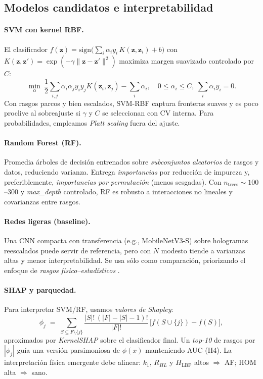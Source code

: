 \subsection{Modelos candidatos e interpretabilidad}
\label{subsec:models}

\paragraph{SVM con kernel RBF.} El clasificador $f(\mathbf{z})=\mathrm{sign}\!\big(\sum_i \alpha_i y_i\,K(\mathbf{z},\mathbf{z}_i)+b\big)$ con $K(\mathbf{z},\mathbf{z}')=\exp(-\gamma\|\mathbf{z}-\mathbf{z}'\|^2)$ maximiza margen suavizado controlado por $C$:
\[
\min_{\alpha}\ \frac{1}{2}\sum_{i,j}\alpha_i\alpha_j y_i y_j K(\mathbf{z}_i,\mathbf{z}_j) - \sum_i \alpha_i,\quad 0\le \alpha_i\le C,\ \sum_i \alpha_i y_i=0.
\]
Con rasgos parcos y bien escalados, SVM-RBF captura fronteras suaves y es poco proclive al sobreajuste si $\gamma$ y $C$ se seleccionan con CV interna. Para probabilidades, empleamos \emph{Platt scaling} fuera del ajuste.

\paragraph{Random Forest (RF).} Promedia árboles de decisión entrenados sobre \emph{subconjuntos aleatorios} de rasgos y datos, reduciendo varianza. Entrega \emph{importancias} por reducción de impureza y, preferiblemente, \emph{importancias por permutación} (menos sesgadas). Con $n_\text{trees}\sim 100$--$300$ y \emph{max\_depth} controlado, RF es robusto a interacciones no lineales y covarianzas entre rasgos.

\paragraph{Redes ligeras (baseline).} Una CNN compacta con transferencia (e.g., MobileNetV3-S) sobre hologramas reescalados puede servir de referencia, pero con $N$ modesto tiende a varianzas altas y menor interpretabilidad. Se usa sólo como comparación, priorizando el enfoque de \emph{rasgos físico–estadísticos} \cite{Alzubaidi2020Electronics}.

\paragraph{SHAP y parquedad.} Para interpretar SVM/RF, usamos \emph{valores de Shapley}:
\begin{equation}
\phi_j \;=\; \sum_{S\subseteq F\setminus\{j\}} \frac{|S|!\,(|F|-|S|-1)!}{|F|!}\,\Big[f(S\cup\{j\})-f(S)\Big],
\end{equation}
aproximados por \emph{KernelSHAP} sobre el clasificador final. Un \emph{top-10} de rasgos por $|\phi_j|$ guía una versión parsimoniosa de $\phi(x)$ manteniendo AUC (H4). La interpretación física emergente debe alinear: $k_1$, $R_{HL}$ y $H_\text{LBP}$ altos $\Rightarrow$ AF; $\mathrm{HOM}$ alta $\Rightarrow$ sano.


